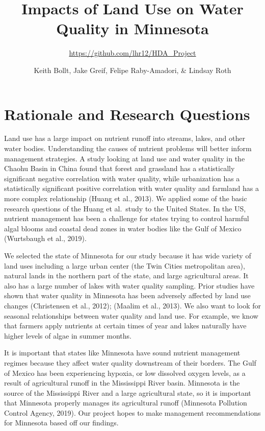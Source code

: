 \documentclass[12pt,]{article}
\title{Impacts of Land Use on Water Quality in Minnesota}
\subtitle{\url{https://github.com/lhr12/HDA_Project}}
\author{Keith Bollt, Jake Greif, Felipe Raby-Amadori, \& Lindsay Roth}
\date{}
\begin{document}
\maketitle

\newpage
\tableofcontents 
\newpage
\listoftables 
\newpage
\listoffigures 
\newpage

\hypertarget{rationale-and-research-questions}{%
\section{Rationale and Research
Questions}\label{rationale-and-research-questions}}

Land use has a large impact on nutrient runoff into streams, lakes, and
other water bodies. Understanding the causes of nutrient problems will
better inform management strategies. A study looking at land use and
water quality in the Chaohu Basin in China found that forest and
grassland has a statistically significant negative correlation with
water quality, while urbanization has a statistically significant
positive correlation with water quality and farmland has a more complex
relationship (Huang et al., 2013). We applied some of the basic research
questions of the Huang et al.~study to the United States. In the US,
nutrient management has been a challenge for states trying to control
harmful algal blooms and coastal dead zones in water bodies like the
Gulf of Mexico (Wurtsbaugh et al., 2019).

We selected the state of Minnesota for our study because it has wide
variety of land uses including a large urban center (the Twin Cities
metropolitan area), natural lands in the northern part of the state, and
large agricultural areas. It also has a large number of lakes with water
quality sampling. Prior studies have shown that water quality in
Minnesota has been adversely affected by land use changes (Christensen
et al., 2012); (Maalim et al., 2013). We also want to look for seasonal
relationships between water quality and land use. For example, we know
that farmers apply nutrients at certain times of year and lakes
naturally have higher levels of algae in summer months.

It is important that states like Minnesota have sound nutrient
management regimes because they affect water quality downstream of their
borders. The Gulf of Mexico has been experiencing hypoxia, or low
dissolved oxygen levels, as a result of agricultural runoff in the
Mississippi River basin. Minnesota is the source of the Mississippi
River and a large agricultural state, so it is important that Minnesota
properly manages its agricultural runoff (Minnesota Pollution Control
Agency, 2019). Our project hopes to make management recommendations for
Minnesota based off our findings.
\end{document}
